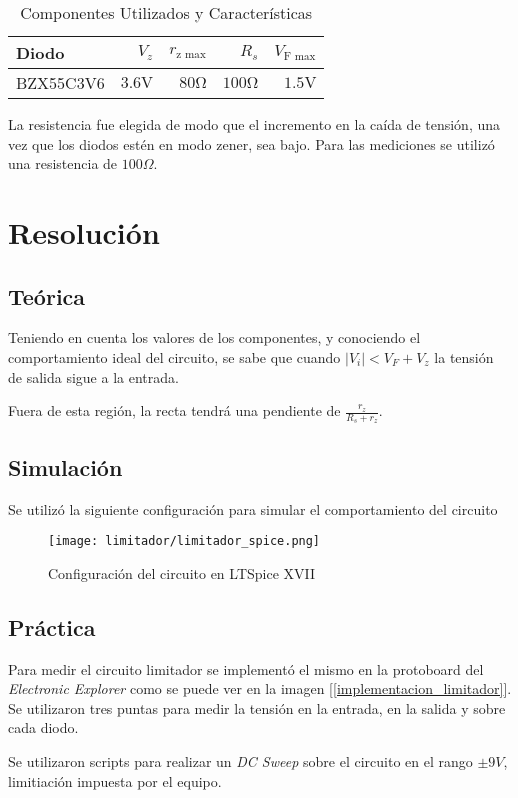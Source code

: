 \begin{table}[ht]
    \begin{center}
        \begin{tabular}{|l|r|r|r|r|}
            \hline
            Diodo & $V_z$ & $r_{\text{z max}}$ & $R_s$ & $V_{\text{F max}}$\\
            \hline
            BZX55C3V6 & $3.6 \si{\volt}$ & $80 \si{\ohm}$ & $100 \si{\ohm}$ & $1.5 \si{\volt}$ \\
            \hline
        \end{tabular}
        \caption{Componentes Utilizados y Características}
    \end{center}
\end{table}

La resistencia fue elegida de modo que el incremento en la caída de tensión, una vez que 
los diodos estén en modo zener, sea bajo. Para las mediciones se utilizó una 
resistencia de $100\Omega$.

\section{Resolución}

\subsection{Teórica}
Teniendo en cuenta los valores de los componentes, y conociendo el comportamiento ideal 
del circuito, se sabe que cuando $|V_i|< V_F+V_z$ la tensión de salida sigue a la entrada.

Fuera de esta región, la recta tendrá una pendiente de $\frac{r_z}{R_s+r_z}$.
\subsection{Simulación}
Se utilizó la siguiente configuración para simular el comportamiento del circuito


\begin{figure}[H]
    \begin{center}
        \texttt{[image: limitador/limitador\_spice.png]}
        \caption{Configuración del circuito en LTSpice XVII}
    \end{center}
\end{figure}

\subsection{Práctica}
Para medir el circuito limitador se implementó el mismo en la protoboard del 
\textit{Electronic Explorer} como se puede ver en la imagen [\ref{implementacion_limitador}].
Se utilizaron tres puntas para medir la tensión en la entrada, en la salida y sobre cada 
diodo. \par 
Se utilizaron scripts para realizar un \textit{DC Sweep} sobre el circuito en el rango 
$\pm 9V$, limitiación impuesta por el equipo.

